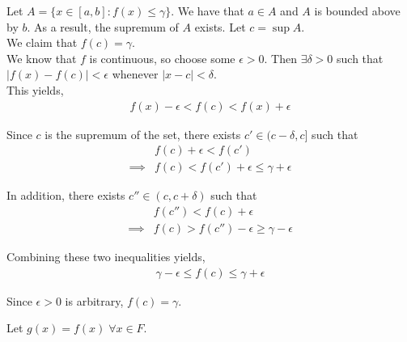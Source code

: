 \documentclass[12pt]{article}
\newenvironment{problem}[2][Problem]{\begin{trivlist}
\item[\hskip \labelsep {\bfseries #1}\hskip \labelsep {\bfseries #2.}]}{\end{trivlist}}
\begin{document}
Let $A = \{x \in [a, b]: f(x) \leq \gamma\}$. We have that $a \in A$ and $A$ is bounded above by $b$. As a result, the supremum of $A$ exists. Let $c = \sup A$.\\

We claim that $f(c) = \gamma$.\\

We know that $f$ is continuous, so choose some $\epsilon > 0$. Then $\exists \delta > 0$ such that $|f(x) - f(c)| < \epsilon$ whenever $|x - c| < \delta$.\\

This yields,
\begin{align*}
f(x) - \epsilon < f(c) < f(x) + \epsilon
\end{align*}

Since $c$ is the supremum of the set, there exists $c' \in (c - \delta, c]$ such that
\begin{align*}
&f(c) + \epsilon < f(c')\\
\implies &f(c) < f(c') + \epsilon \leq \gamma + \epsilon
\end{align*}

In addition, there exists $c'' \in (c, c + \delta)$ such that 
\begin{align*}
&f(c'') < f(c) + \epsilon\\
\implies &f(c) > f(c'') - \epsilon \geq \gamma - \epsilon
\end{align*}

Combining these two inequalities yields, 
\begin{align*}
\gamma - \epsilon \leq f(c) \leq \gamma + \epsilon
\end{align*}

Since $\epsilon > 0$ is arbitrary, $f(c) = \gamma$.

\begin{problem}{3}
\end{problem}

Let $g(x) = f(x) \; \forall x \in F$.

\begin{problem}{4}
\end{problem}
\end{document}

